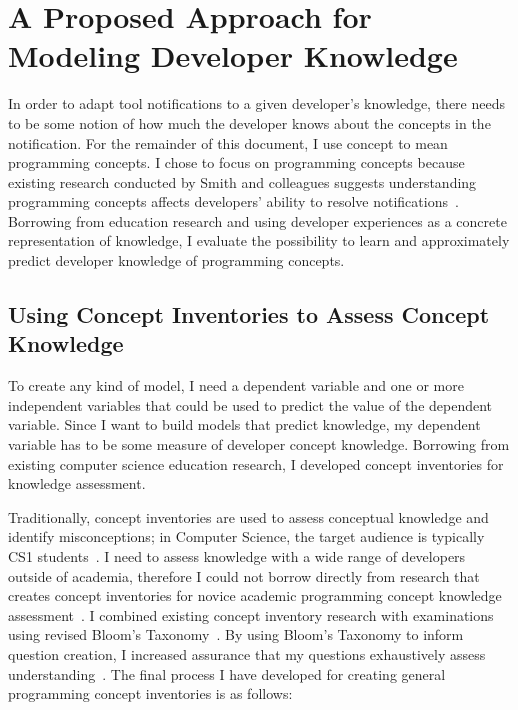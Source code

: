 \documentclass{llncs}
\begin{document}
\section{A Proposed Approach for Modeling Developer Knowledge}
In order to adapt tool notifications to a given developer's knowledge, there needs to be some notion of how much the developer knows about the concepts in the notification. For the remainder of this document, I use concept to mean programming concepts. I chose to focus on programming concepts because existing research conducted by Smith and colleagues suggests understanding programming concepts affects developers' ability to resolve notifications~\cite{smith2015questions}. Borrowing from education research and using developer experiences as a concrete representation of knowledge, I evaluate the possibility to learn and approximately predict developer knowledge of programming concepts.

\subsection{Using Concept Inventories to Assess Concept Knowledge}
To create any kind of model, I need a dependent variable and one or more independent variables that could be used to predict the value of the dependent variable. Since I want to build models that predict knowledge, my dependent variable has to be some measure of developer concept knowledge.
Borrowing from existing computer science education research, I developed concept inventories for knowledge assessment. 


Traditionally, concept inventories are used to  assess conceptual knowledge and identify misconceptions; in Computer Science, the target audience is typically CS1 students~\cite{tew2010developing,kaczmarczyk2010identifying}. 
I need to assess knowledge with a wide range of developers outside of academia, therefore I could not borrow directly from research that creates concept inventories for novice academic programming concept knowledge assessment~\cite{tew2010assessing}. I combined existing concept inventory research with examinations using revised Bloom's Taxonomy~\cite{tew2010developing,nelson1967testing,scott2003bloom}. By using Bloom's Taxonomy to inform question creation, I increased assurance that my questions exhaustively assess understanding~\cite{scott2003bloom}. 
The final process I have developed for creating general programming concept inventories is as follows:
\end{document}
